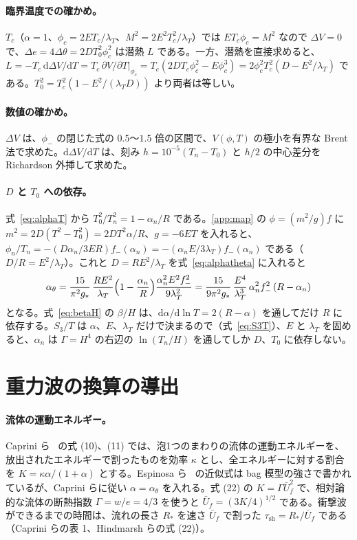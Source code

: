 \documentclass[a4paper,10pt]{ltjsarticle}
\newcommand{\dd}{\mathrm{d}}
\begin{document}
\paragraph{臨界温度での確かめ。}$T_c$（$\alpha=1$、$\phi_c=2ET_c/\lambda_T$、$M^2=2E^2T_c^2/\lambda_T$）では $ET_c\phi_c=M^2$ なので $\Delta V=0$ で、$\Delta e=4\Delta\theta=2DT_0^2\phi_c^2$ は潜熱 $L$ である。一方、潜熱を直接求めると、$L=-T_c\,\dd\Delta V/\dd T=T_c\,\partial V/\partial T|_{\phi_c}=T_c(2DT_c\phi_c^2-E\phi_c^3)=2\phi_c^2T_c^2(D-E^2/\lambda_T)$ である。$T_0^2=T_c^2(1-E^2/(\lambda_TD))$ より両者は等しい。

\paragraph{数値の確かめ。}$\Delta V$ は、$\phi_-$ の閉じた式の $0.5$〜$1.5$ 倍の区間で、$V(\phi,T)$ の極小を有界な Brent 法で求めた。$\dd\Delta V/\dd T$ は、刻み $h=10^{-5}(T_n-T_0)$ と $h/2$ の中心差分を Richardson 外挿して求めた。

\paragraph{$D$ と $T_0$ への依存。}式~\eqref{eq:alphaT} から $T_0^2/T_n^2=1-\alpha_n/R$ である。\ref{app:map} の $\phi=(m^2/g)f$ に $m^2=2D(T^2-T_0^2)=2DT^2\alpha/R$、$g=-6ET$ を入れると、$\phi_n/T_n=-(D\alpha_n/3ER)f_-(\alpha_n)=-(\alpha_nE/3\lambda_T)f_-(\alpha_n)$ である（$D/R=E^2/\lambda_T$）。これと $D=RE^2/\lambda_T$ を式~\eqref{eq:alphatheta} に入れると
\begin{equation*}
\alpha_\theta=\frac{15}{\pi^2g_*}\,\frac{RE^2}{\lambda_T}\Bigl(1-\frac{\alpha_n}{R}\Bigr)\frac{\alpha_n^2E^2f_-^2}{9\lambda_T^2}
=\frac{15}{9\pi^2g_*}\,\frac{E^4}{\lambda_T^3}\,\alpha_n^2f_-^2\,(R-\alpha_n)
\end{equation*}
となる。式~\eqref{eq:betaH} の $\beta/H$ は、$\dd\alpha/\dd\ln T=2(R-\alpha)$ を通してだけ $R$ に依存する。$S_3/T$ は $\alpha$、$E$、$\lambda_T$ だけで決まるので（式~\eqref{eq:S3T}）、$E$ と $\lambda_T$ を固めると、$\alpha_n$ は $\Gamma=H^4$ の右辺の $\ln(T_n/H)$ を通してしか $D$、$T_0$ に依存しない。

\section{重力波の換算の導出}\label{app:gw}

\paragraph{流体の運動エネルギー。}Caprini ら~\cite{caprini20} の式 (10)、(11) では、泡1つのまわりの流体の運動エネルギーを、放出されたエネルギーで割ったものを効率 $\kappa$ とし、全エネルギーに対する割合を $K=\kappa\alpha/(1+\alpha)$ とする。Espinosa ら~\cite{espinosa10} の近似式は bag 模型の強さで書かれているが、Caprini らに従い $\alpha=\alpha_\theta$ を入れる。式 (22) の $K=\Gamma\bar U_f^2$ で、相対論的な流体の断熱指数 $\Gamma=w/e=4/3$ を使うと $\bar U_f=(3K/4)^{1/2}$ である。衝撃波ができるまでの時間は、流れの長さ $R_*$ を速さ $\bar U_f$ で割った $\tau_{\mathrm{sh}}=R_*/\bar U_f$ である（Caprini らの表 1、Hindmarsh らの式 (22)）。
\end{document}
